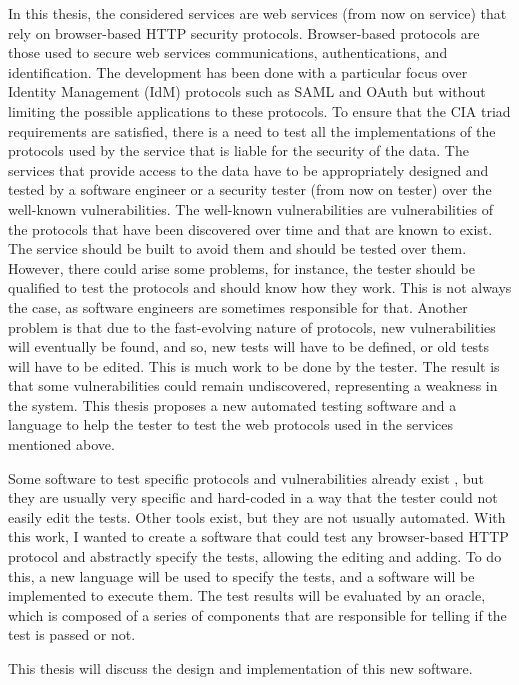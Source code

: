 In this thesis, the considered services are web services (from now on service) that rely on browser-based HTTP security protocols. Browser-based protocols are those used to secure web services communications, authentications, and identification. The development has been done with a particular focus over Identity Management (IdM) protocols such as \gls{SAML} and \gls{OAuth} but without limiting the possible applications to these protocols.
To ensure that the CIA triad requirements are satisfied, there is a need to test all the implementations of the protocols used by the service that is liable for the security of the data. The services that provide access to the data have to be appropriately designed and tested by a software engineer or a security tester (from now on tester) over the well-known vulnerabilities. The well-known vulnerabilities are vulnerabilities of the protocols that have been discovered over time and that are known to exist. The service should be built to avoid them and should be tested over them. However, there could arise some problems, for instance, the tester should be qualified to test the protocols and should know how they work. This is not always the case, as software engineers are sometimes responsible for that. Another problem is that due to the fast-evolving nature of protocols, new vulnerabilities will eventually be found, and so, new tests will have to be defined, or old tests will have to be edited. This is much work to be done by the tester. The result is that some vulnerabilities could remain undiscovered, representing a weakness in the system. This thesis proposes a new automated testing software and a language to help the tester to test the web protocols used in the services mentioned above. 

Some software to test specific protocols and vulnerabilities already exist \cite{wendy_barreto,claudio_grisenti}, but they are usually very specific and hard-coded in a way that the tester could not easily edit the tests. Other tools exist, but they are not usually automated. With this work, I wanted to create a software that could test any browser-based HTTP protocol and abstractly specify the tests, allowing the editing and adding. To do this, a new language will be used to specify the tests, and a software will be implemented to execute them. The test results will be evaluated by an oracle, which is composed of a series of components that are responsible for telling if the test is passed or not.

This thesis will discuss the design and implementation of this new software.

